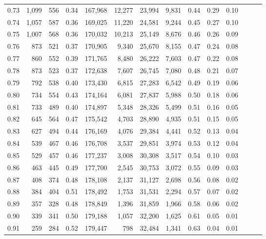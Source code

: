 \begin{tabular}{rrrrrrrrrrrrrr}
0.73 &  1,099 &  556 &  0.34 &  167,968 &   12,277 &  23,994 &   9,831 &  0.44 &  0.29 &      0.10 \\
0.74 &  1,057 &  587 &  0.36 &  169,025 &   11,220 &  24,581 &   9,244 &  0.45 &  0.27 &      0.10 \\
0.75 &  1,007 &  568 &  0.36 &  170,032 &   10,213 &  25,149 &   8,676 &  0.46 &  0.26 &      0.09 \\
0.76 &    873 &  521 &  0.37 &  170,905 &    9,340 &  25,670 &   8,155 &  0.47 &  0.24 &      0.08 \\
0.77 &    860 &  552 &  0.39 &  171,765 &    8,480 &  26,222 &   7,603 &  0.47 &  0.22 &      0.08 \\
0.78 &    873 &  523 &  0.37 &  172,638 &    7,607 &  26,745 &   7,080 &  0.48 &  0.21 &      0.07 \\
0.79 &    792 &  538 &  0.40 &  173,430 &    6,815 &  27,283 &   6,542 &  0.49 &  0.19 &      0.06 \\
0.80 &    734 &  554 &  0.43 &  174,164 &    6,081 &  27,837 &   5,988 &  0.50 &  0.18 &      0.06 \\
0.81 &    733 &  489 &  0.40 &  174,897 &    5,348 &  28,326 &   5,499 &  0.51 &  0.16 &      0.05 \\
0.82 &    645 &  564 &  0.47 &  175,542 &    4,703 &  28,890 &   4,935 &  0.51 &  0.15 &      0.05 \\
0.83 &    627 &  494 &  0.44 &  176,169 &    4,076 &  29,384 &   4,441 &  0.52 &  0.13 &      0.04 \\
0.84 &    539 &  467 &  0.46 &  176,708 &    3,537 &  29,851 &   3,974 &  0.53 &  0.12 &      0.04 \\
0.85 &    529 &  457 &  0.46 &  177,237 &    3,008 &  30,308 &   3,517 &  0.54 &  0.10 &      0.03 \\
0.86 &    463 &  445 &  0.49 &  177,700 &    2,545 &  30,753 &   3,072 &  0.55 &  0.09 &      0.03 \\
0.87 &    408 &  374 &  0.48 &  178,108 &    2,137 &  31,127 &   2,698 &  0.56 &  0.08 &      0.02 \\
0.88 &    384 &  404 &  0.51 &  178,492 &    1,753 &  31,531 &   2,294 &  0.57 &  0.07 &      0.02 \\
0.89 &    357 &  328 &  0.48 &  178,849 &    1,396 &  31,859 &   1,966 &  0.58 &  0.06 &      0.02 \\
0.90 &    339 &  341 &  0.50 &  179,188 &    1,057 &  32,200 &   1,625 &  0.61 &  0.05 &      0.01 \\
0.91 &    259 &  284 &  0.52 &  179,447 &      798 &  32,484 &   1,341 &  0.63 &  0.04 &      0.01 \\

\end{tabular}
